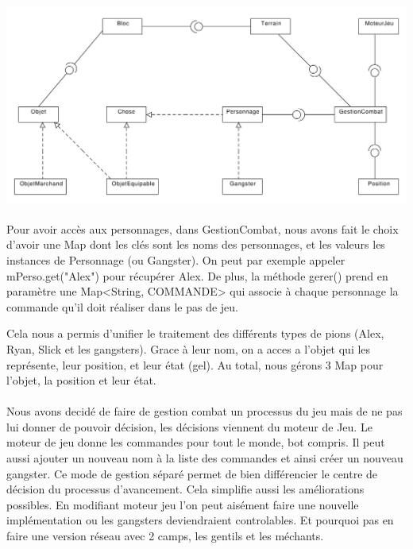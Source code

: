 \documentclass[a4paper,titlepage,openany,12pt]{report}
\begin{document}
\begin{landscape}  %
  \includegraphics[width=24cm]{../presentation/diagProjetCPS}
\end{landscape}

\paragraph{}
Pour avoir accès aux personnages, dans GestionCombat, nous avons fait le choix d'avoir une Map dont les
clés sont les noms des personnages, et les valeurs les instances de Personnage (ou Gangster). On peut par 
exemple appeler mPerso.get("Alex") pour récupérer Alex.
De plus, la méthode gerer() prend en paramètre une Map<String, COMMANDE> qui associe à chaque personnage
la commande qu'il doit réaliser dans le pas de jeu.

Cela nous a permis d'unifier le traitement des différents types de
pions (Alex, Ryan, Slick et les gangsters).
Grace à leur nom, on a acces a l'objet qui les représente, leur
position, et leur état (gel).
Au total, nous gérons 3 Map pour l'objet, la position et leur état.

\paragraph{}
Nous avons decidé de faire de gestion combat un processus du jeu mais
de ne pas lui donner de pouvoir décision, les décisions viennent du
moteur de Jeu.
Le moteur de jeu donne les commandes pour tout le monde, bot compris.
Il peut aussi ajouter un nouveau nom à la liste des commandes et ainsi
créer un nouveau gangster.
Ce mode de gestion séparé permet de bien différencier le centre de
décision du processus d'avancement. Cela simplifie aussi les
améliorations possibles.
En modifiant moteur jeu l'on peut aisément faire une nouvelle
implémentation ou les gangsters deviendraient controlables. Et pourquoi
pas en faire une version réseau avec 2 camps, les gentils et les méchants.
\end{document}
